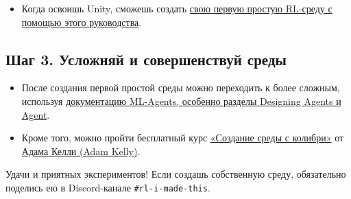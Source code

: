 \documentclass[11pt,a4paper]{article}
\begin{document}
\begin{itemize}
\tightlist
\item
  Когда освоишь Unity, сможешь создать \href{https://github.com/Unity-Technologies/ml-agents/blob/release_20_docs/docs/Learning-Environment-Create-New.md}{свою первую простую RL-среду с помощью этого руководства}.
\end{itemize}

\subsection{Шаг 3. Усложняй и совершенствуй среды}\label{step-3-iterate-and-create-nice-environments}

\begin{itemize}
\tightlist
\item
  После создания первой простой среды можно переходить к более сложным, используя \href{https://github.com/Unity-Technologies/ml-agents/blob/release_20_docs/docs/}{документацию ML-Agents, особенно разделы Designing Agents и Agent}.
\item
  Кроме того, можно пройти бесплатный курс \href{https://learn.unity.com/course/ml-agents-hummingbirds}{«Создание среды с колибри»} от \href{https://twitter.com/aktwelve}{Адама Келли (Adam Kelly)}.
\end{itemize}

Удачи и приятных экспериментов! Если создашь собственную среду, обязательно поделись ею в Discord-канале \texttt{\#rl-i-made-this}.

\endgroup
\end{document}
